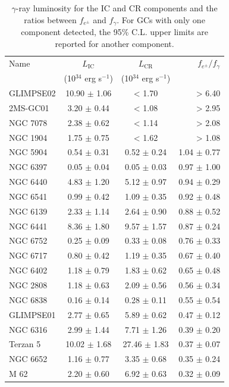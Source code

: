 \documentclass[doublespace,draft,nopageskip]{VTthesis} %
\begin{document}
\begin{table}
    \centering
    \caption{$\gamma$-ray luminosity for the IC and CR  components and the ratios between $f_{e^\pm}$ and $f_\gamma$. For GCs with only one component detected, the 95\% C.L. upper limits are reported for another component.}
    \begin{tabular}{lccr}
\hline
Name & $L_\mathrm{{IC}}$ & $L_\mathrm{CR}$ & $f_{e^\pm}/f_\gamma$ \\
 & (10$^{34}$ erg s$^{-1}$) & (10$^{34}$ erg s$^{-1}$) &  \\
\hline
GLIMPSE02 & 10.90 $\pm$ 1.06 & < 1.70 & > 6.40 \\
2MS-GC01 & 3.20 $\pm$ 0.44 & < 1.08 & > 2.95 \\
NGC 7078 & 2.38 $\pm$ 0.62 & < 1.14 & > 2.08 \\
NGC 1904 & 1.75 $\pm$ 0.75 & < 1.62 & > 1.08 \\
NGC 5904 & 0.54 $\pm$ 0.31 & 0.52 $\pm$ 0.24 & 1.04 $\pm$ 0.77 \\
NGC 6397 & 0.05 $\pm$ 0.04 & 0.05 $\pm$ 0.03 & 0.97 $\pm$ 1.00 \\
NGC 6440 & 4.83 $\pm$ 1.20 & 5.12 $\pm$ 0.97 & 0.94 $\pm$ 0.29 \\
NGC 6541 & 0.99 $\pm$ 0.42 & 1.09 $\pm$ 0.35 & 0.92 $\pm$ 0.48 \\
NGC 6139 & 2.33 $\pm$ 1.14 & 2.64 $\pm$ 0.90 & 0.88 $\pm$ 0.52 \\
NGC 6441 & 8.36 $\pm$ 1.80 & 9.57 $\pm$ 1.57 & 0.87 $\pm$ 0.24 \\
NGC 6752 & 0.25 $\pm$ 0.09 & 0.33 $\pm$ 0.08 & 0.76 $\pm$ 0.33 \\
NGC 6717 & 0.80 $\pm$ 0.42 & 1.19 $\pm$ 0.35 & 0.67 $\pm$ 0.40 \\
NGC 6402 & 1.18 $\pm$ 0.79 & 1.83 $\pm$ 0.62 & 0.65 $\pm$ 0.48 \\
NGC 2808 & 1.18 $\pm$ 0.63 & 2.09 $\pm$ 0.56 & 0.56 $\pm$ 0.34 \\
NGC 6838 & 0.16 $\pm$ 0.14 & 0.28 $\pm$ 0.11 & 0.55 $\pm$ 0.54 \\
GLIMPSE01 & 2.77 $\pm$ 0.65 & 5.89 $\pm$ 0.62 & 0.47 $\pm$ 0.12 \\
NGC 6316 & 2.99 $\pm$ 1.44 & 7.71 $\pm$ 1.26 & 0.39 $\pm$ 0.20 \\
Terzan 5 & 10.02 $\pm$ 1.68 & 27.46 $\pm$ 1.83 & 0.37 $\pm$ 0.07 \\
NGC 6652 & 1.16 $\pm$ 0.77 & 3.35 $\pm$ 0.68 & 0.35 $\pm$ 0.24 \\
M 62 & 2.20 $\pm$ 0.60 & 6.92 $\pm$ 0.63 & 0.32 $\pm$ 0.09 \\

\end{tabular}
\end{table}
\end{document}
